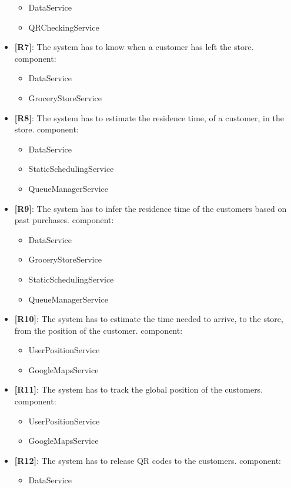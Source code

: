 \begin{itemize}
\begin{itemize}
	\item DataService 
	\item QRCheckingService
	\end{itemize}
	\item {\textbf{[R7]}}: The system has to know when a customer has left the store.
component:
	\begin{itemize}
	\item DataService 
	\item GroceryStoreService
	\end{itemize}
	\item {\textbf{[R8]}}: The system has to estimate the residence time, of a customer, in the store.
component:
	\begin{itemize}
	\item DataService 
	\item StaticSchedulingService 
	\item QueueManagerService 
	\end{itemize}
	\item {\textbf{[R9]}}: The system has to infer the residence time of the customers based on past purchases.
component:
	\begin{itemize}
	\item DataService 
	\item GroceryStoreService 
	\item StaticSchedulingService
	\item QueueManagerService 
	\end{itemize}
	\item {\textbf{[R10]}}: The system has to estimate the time needed to arrive, to the store, from the position of the customer.
component:
	\begin{itemize}
	\item UserPositionService 
	\item GoogleMapsService 
	\end{itemize}
	\item {\textbf{[R11]}}: The system has to track the global position of the customers.
component:
	\begin{itemize}
	\item UserPositionService 
	\item GoogleMapsService
	\end{itemize}
	\item {\textbf{[R12]}}: The system has to release QR codes to the customers.
component:
	\begin{itemize}
	\item DataService 

\end{itemize}
\end{itemize}
